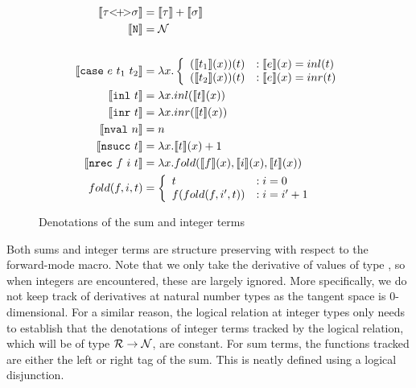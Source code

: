   \begin{figure}
    \centering
    \begin{equation*}
      \begin{split}
        \llbracket \tau {<}\!{+}\!{>} \sigma \rrbracket &= \llbracket \tau \rrbracket + \llbracket \sigma \rrbracket \\
        \llbracket \texttt{N} \rrbracket &= \mathcal{N} \\
        \\
        \llbracket \texttt{case}\ e\ t_1\ t_2 \rrbracket &= \lambda x.
          \left\{
            \begin{array}{ll}
              (\llbracket t_1 \rrbracket(x))(t)
                & : \llbracket e \rrbracket(x) = inl(t) \\
              (\llbracket t_2 \rrbracket(x))(t)
                & : \llbracket e \rrbracket(x) = inr(t) \\
            \end{array}
          \right. \\
        \llbracket \texttt{inl}\ t \rrbracket &= \lambda x. inl(\llbracket t \rrbracket(x)) \\
        \llbracket \texttt{inr}\ t \rrbracket &= \lambda x. inr(\llbracket t \rrbracket(x)) \\
        \llbracket \texttt{nval}\ n \rrbracket &= n \\
        \llbracket \texttt{nsucc}\ t \rrbracket &= \lambda x. \llbracket t \rrbracket(x) + 1 \\
        \llbracket \texttt{nrec}\ f\ i\ t \rrbracket &= \lambda x. fold(\llbracket f \rrbracket(x), \llbracket i \rrbracket(x), \llbracket t \rrbracket(x)) \\
        fold(f, i, t) &=
          \left\{
            \begin{array}{ll}
              t &: i = 0 \\
              f(fold(f, i', t))
                &: i = i' + 1 \\
            \end{array}
          \right. \\
      \end{split}
    \end{equation*}
    \caption{Denotations of the sum and integer terms}
    \label{eqn:denotation_sums_prim}
  \end{figure}

  Both sums and integer terms are structure preserving with respect to the forward-mode macro.
  Note that we only take the derivative of values of type \synR, so when integers are encountered, these are largely ignored.
  More specifically, we do not keep track of derivatives at natural number types as the tangent space is $0$-dimensional.
  For a similar reason, the logical relation at integer types only needs to establish that the denotations of integer terms tracked by the logical relation, which will be of type $\mathcal{R} \to \mathcal{N}$, are constant.
  For sum terms, the functions tracked are either the left or right tag of the sum.
  This is neatly defined using a logical disjunction.


